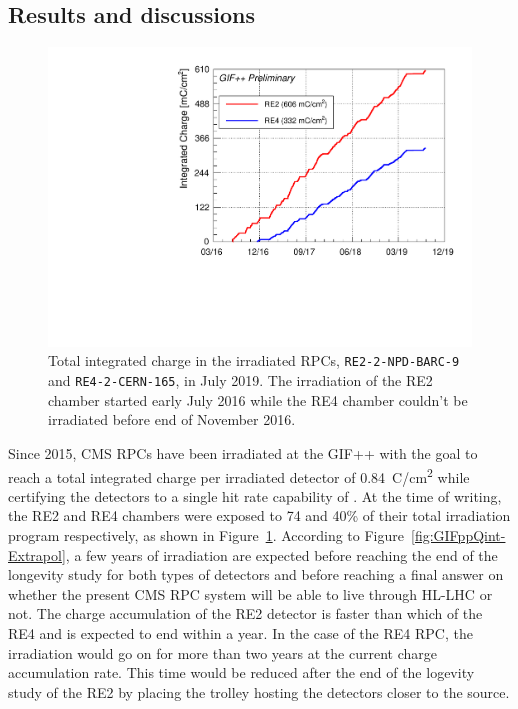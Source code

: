 \newpage
	
	\subsection{Results and discussions}
	\label{chapt5:ssec:resultsGIFpp}
	
\begingroup\setlength{\intextsep}{0pt}\setlength{\columnsep}{15pt}
	
	\begin{figure}
        \centering
		\includegraphics[width = \linewidth]{fig/chapt5/GIFpp-Qint.pdf}
		\caption{\label{fig:GIFppQint} Total integrated charge in the irradiated RPCs, \texttt{RE2-2-NPD-BARC-9} and \texttt{RE4-2-CERN-165}, in July 2019. The irradiation of the RE2 chamber started early July 2016 while the RE4 chamber couldn't be irradiated before end of November 2016.}
	\end{figure}
    
    Since 2015, CMS RPCs have been irradiated at the GIF++ with the goal to reach a total integrated charge per irradiated detector of \SI{0.84}{C/cm^2} while certifying the detectors to a single hit rate capability of . At the time of writing, the RE2 and RE4 chambers were exposed to 74 and 40\% of their total irradiation program respectively, as shown in Figure~\ref{fig:GIFppQint}. According to Figure~\ref{fig:GIFppQint-Extrapol}, a few years of irradiation are expected before reaching the end of the longevity study for both types of detectors and before reaching a final answer on whether the present CMS RPC system will be able to live through HL-LHC or not. The charge accumulation of the RE2 detector is faster than which of the RE4 and is expected to end within a year. In the case of the RE4 RPC, the irradiation would go on for more than two years at the current charge accumulation rate. This time would be reduced after the end of the logevity study of the RE2 by placing the trolley hosting the detectors closer to the source.
    
